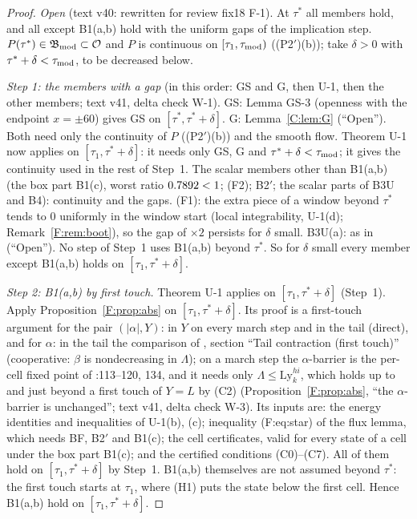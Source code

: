 \documentclass[11pt]{article}
\begin{document}
\begin{proof}
\emph{Open} (text v40: rewritten for review fix18 F-1). At $\tau^*$ all members hold, and all except B1(a,b) hold with the uniform gaps of the implication step. $P(\tau^*)\in\mathfrak B_{\rm mod}\subset\mathcal O$ and $P$ is continuous on $[\tau_1,\tau_{\rm mod})$ ((P2$'$)(b)); take $\delta>0$ with $\tau^*+\delta<\tau_{\rm mod}$, to be decreased below.

\emph{Step 1: the members with a gap} (in this order: GS and G, then U-1, then the other members; text v41, delta check  W-1). GS: Lemma GS-3 (openness with the endpoint $x=\pm60$) gives GS on $[\tau^*,\tau^*+\delta]$. G: Lemma~\ref{C:lem:G} (``Open''). Both need only the continuity of $P$ ((P2$'$)(b)) and the smooth flow. Theorem U-1 now applies on $[\tau_1,\tau^*+\delta]$: it needs only GS, G and $\tau^*+\delta<\tau_{\rm mod}$; it gives the continuity used in the rest of Step~1. The scalar members other than B1(a,b) (the box part B1(c), worst ratio $0.7892<1$; (F2); B2$'$; the scalar parts of B3U and B4): continuity and the gaps. (F1): the extra piece of a window beyond $\tau^*$ tends to $0$ uniformly in the window start (local integrability, U-1(d);  Remark~\ref{F:rem:boot}), so the gap of $\times2$ persists for $\delta$ small. B3U(a): as in  (``Open''). No step of Step~1 uses B1(a,b) beyond $\tau^*$. So for $\delta$ small every member except B1(a,b) holds on $[\tau_1,\tau^*+\delta]$.

\emph{Step 2: B1(a,b) by first touch.} Theorem U-1 applies on $[\tau_1,\tau^*+\delta]$ (Step~1). Apply Proposition~\ref{F:prop:abs} on $[\tau_1,\tau^*+\delta]$. Its proof is a first-touch argument for the pair $(|\alpha|,Y)$: in $Y$ on every march step and in the tail (direct), and for $\alpha$: in the tail the comparison of , section ``Tail contraction (first touch)'' (cooperative: $\beta$ is nondecreasing in $\Lambda$); on a march step the $\alpha$-barrier is the per-cell fixed point of :113--120, 134, and it needs only $\Lambda\le\mathrm{Ly}^{hi}_k$, which holds up to and just beyond a first touch of $Y=L$ by (C2) (Proposition~\ref{F:prop:abs}, ``the $\alpha$-barrier is unchanged''; text v41, delta check  W-3). Its inputs are: the energy identities and inequalities of U-1(b), (c); inequality (F:eq:star) of the flux lemma, which needs BF, B2$'$ and B1(c); the cell certificates, valid for every state of a cell under the box part B1(c); and the certified conditions (C0)--(C7). All of them hold on $[\tau_1,\tau^*+\delta]$ by Step~1. B1(a,b) themselves are not assumed beyond $\tau^*$: the first touch starts at $\tau_1$, where (H1) puts the state below the first cell. Hence B1(a,b) hold on $[\tau_1,\tau^*+\delta]$.


\end{proof}
\end{document}
